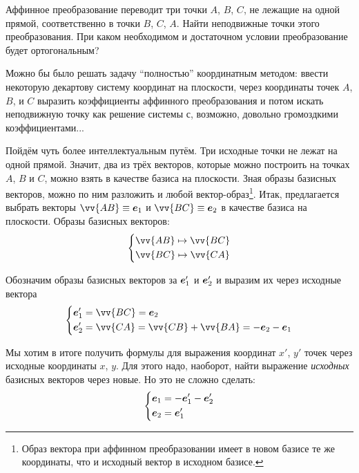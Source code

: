 \documentclass[a4paper,12pt]{article}
\begin{document}
  Аффинное преобразование переводит три точки $A$, $B$, $C$, не лежащие на одной прямой, соответственно в точки $B$, $C$, $A$.
  Найти неподвижные точки этого преобразования.
  При каком необходимом и достаточном условии преобразование будет ортогональным?  %
  
  \begin{solution}
    Можно бы было решать задачу ``полностью'' координатным методом: ввести некоторую декартову систему координат на плоскости, через координаты точек $A$, $B$, и $C$ выразить коэффициенты аффинного преобразования и потом искать неподвижную точку как решение системы с, возможно, довольно громоздкими коэффициентами...
    
    Пойдём чуть более интеллектуальным путём.
    Три исходные точки не лежат на одной прямой.
    Значит, два из трёх векторов, которые можно построить на точках $A$, $B$ и $C$, можно взять в качестве базиса на плоскости.
    Зная образы базисных векторов, можно по ним разложить и любой вектор-образ\footnote{
      Образ вектора при аффинном преобразовании имеет в новом базисе те же координаты, что и исходный вектор в исходном базисе. %
    }.
    Итак, предлагается выбрать векторы $\vv{AB} \hm\equiv \bds e_1$ и $\vv{BC} \hm\equiv \bds e_2$ в качестве базиса на плоскости.
    Образы базисных векторов:
    \[
      \left\{
        \begin{aligned}
          &\vv{AB} \mapsto \vv{BC}\\
          &\vv{BC} \mapsto \vv{CA}
        \end{aligned}
      \right.
    \]
    
    Обозначим образы базисных векторов за $\boldsymbol e_1'$ и $\boldsymbol e_2'$ и выразим их через исходные вектора
    \[
      \left\{
        \begin{aligned}
          &\bds e_1' = \vv{BC} = \bds e_2\\
          &\bds e_2' = \vv{CA} = \vv{CB} + \vv{BA} = -\bds e_2 - \bds e_1
        \end{aligned}
      \right.
    \]
    
    Мы хотим в итоге получить формулы для выражения координат $x'$, $y'$ точек через исходные координаты $x$, $y$.
    Для этого надо, наоборот, найти выражение \emph{исходных} базисных векторов через новые.
    Но это не сложно сделать:
    \[
      \left\{
        \begin{aligned}
          &\boldsymbol e_1 = -\boldsymbol e_1' - \boldsymbol e_2'\\
          &\boldsymbol e_2 = \boldsymbol e_1'
        \end{aligned}
      \right.
    \]
    

\end{solution}
\end{document}
